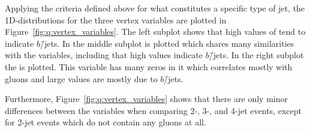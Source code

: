 Applying the criteria defined above for what constitutes a specific type of jet, the 1D-distributions for the three vertex variables are plotted in Figure~\ref{fig:q:vertex_variables}. 
The left subplot shows that high values of  tend to indicate $b$\=/jets. 
In the middle subplot  is plotted which shares many similarities with the  variables, including that high values indicate $b$\=/jets. In the right subplot the  is plotted. This variable has many zeros in it which correlates mostly with gluons and large values are mostly due to $b$\=/jets. 

Furthermore, Figure~\ref{fig:q:vertex_variables} shows that there are only minor differences between the variables when comparing 2-, 3-, and 4-jet events, except for 2-jet events which do not contain any gluons at all. 


